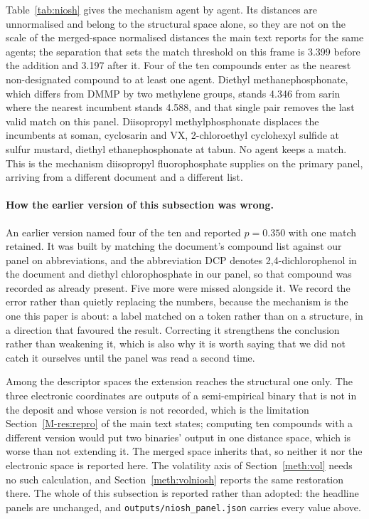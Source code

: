 \documentclass[11pt,a4paper]{article}
\begin{document}
Table~\ref{tab:niosh} gives the mechanism agent by agent. Its distances are
unnormalised and belong to the structural space alone, so they are not on the
scale of the merged-space normalised distances the main text reports for the
same agents; the separation that sets the match threshold on this frame is
3.399 before the addition and 3.197 after it. Four of the ten compounds enter as
the nearest non-designated compound to at least one agent. Diethyl
methanephosphonate, which differs from DMMP by two methylene groups, stands
4.346 from sarin where the nearest incumbent stands 4.588, and that single pair
removes the last valid match on this panel. Diisopropyl methylphosphonate displaces the
incumbents at soman, cyclosarin and VX, 2-chloroethyl cyclohexyl sulfide at
sulfur mustard, diethyl ethanephosphonate at tabun. No agent keeps a match.
This is the mechanism diisopropyl fluorophosphate supplies on the primary panel,
arriving from a different document and a different list.

\paragraph{How the earlier version of this subsection was wrong.} An earlier
version named four of the ten and reported $p = 0.350$ with one match retained.
It was built by matching the document's compound list against our panel on
abbreviations, and the abbreviation DCP denotes 2,4-dichlorophenol in the
document and diethyl chlorophosphate in our panel, so that compound was recorded
as already present. Five more were missed alongside it. We record the error
rather than quietly replacing the numbers, because the mechanism is the one this
paper is about: a label matched on a token rather than on a structure, in a
direction that favoured the result. Correcting it strengthens the conclusion
rather than weakening it, which is also why it is worth saying that we did not
catch it ourselves until the panel was read a second time.

Among the descriptor spaces the extension reaches the structural one only. The
three electronic coordinates are outputs of a semi-empirical binary that is not in the deposit
and whose version is not recorded, which is the limitation
Section~\ref{M-res:repro} of the main text states; computing ten compounds with
a different version would put two binaries' output in one distance space, which
is worse than not extending it. The merged space inherits that, so neither it
nor the electronic space is reported here. The volatility axis of
Section~\ref{meth:vol} needs no such calculation, and
Section~\ref{meth:volniosh} reports the same restoration there. The whole of this subsection is
reported rather than adopted: the headline panels are unchanged, and
\texttt{outputs/niosh\_panel.json} carries every value above.
\end{document}
